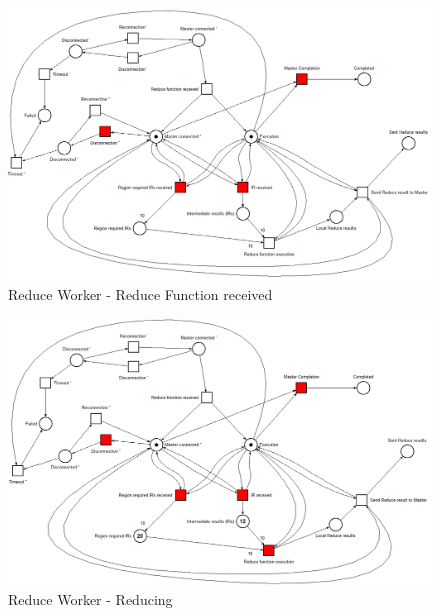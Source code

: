 \begin{figure}[!ht]
    \centering
    \includegraphics[width=\linewidth]{document/chapters/chapter_6/images/reduce_worker_petri_net_2.png}
    \caption{Reduce Worker - Reduce Function received}
    \label{fig:map_worker_petri_net_2}
\end{figure}

\begin{figure}[!ht]
    \centering
    \includegraphics[width=\linewidth]{document/chapters/chapter_6/images/reduce_worker_petri_net_3.png}
    \caption{Reduce Worker - Reducing}
    \label{fig:map_worker_petri_net_3}
\end{figure}


